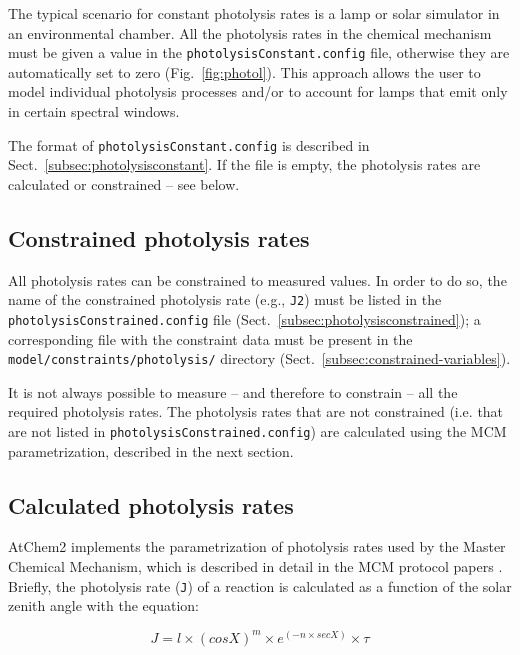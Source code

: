 The typical scenario for constant photolysis rates is a lamp or solar
simulator in an environmental chamber. All the photolysis rates in the
chemical mechanism must be given a value in the \texttt{photolysisConstant.config}
file, otherwise they are automatically set to zero (Fig.~\ref{fig:photol}).
This approach allows the user to model individual photolysis processes
and/or to account for lamps that emit only in certain spectral
windows.

The format of \texttt{photolysisConstant.config} is described in
Sect.~\ref{subsec:photolysisconstant}. If the file is empty, the
photolysis rates are calculated or constrained -- see below.

\subsection{Constrained photolysis rates} \label{subsec:constrained-photolysis-rates}

All photolysis rates can be constrained to measured values. In order
to do so, the name of the constrained photolysis rate (e.g.,
\texttt{J2}) must be listed in the
\texttt{photolysisConstrained.config} file
(Sect.~\ref{subsec:photolysisconstrained}); a corresponding file with
the constraint data must be present in the
\texttt{model/constraints/photolysis/} directory
(Sect.~\ref{subsec:constrained-variables}).

It is not always possible to measure -- and therefore to constrain --
all the required photolysis rates. The photolysis rates that are not
constrained (i.e. that are not listed in
\texttt{photolysisConstrained.config}) are calculated using the MCM
parametrization, described in the next section.

\subsection{Calculated photolysis rates} \label{subsec:calculated-photolysis-rates}

AtChem2 implements the parametrization of photolysis rates used by the
Master Chemical Mechanism, which is described in detail in the MCM
protocol papers \citep{jenkin_1997, saunders_2003}. Briefly, the
photolysis rate (\texttt{J}) of a reaction is calculated as a function
of the solar zenith angle with the equation:

\begin{equation}
  J = l \times (cosX)^m \times e^{(-n \times secX)} \times \tau
\end{equation}

